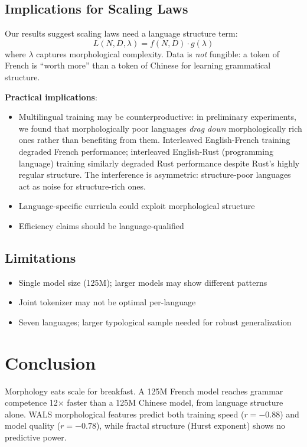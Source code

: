 \documentclass[11pt]{article}
\begin{document}
\subsection{Implications for Scaling Laws}

Our results suggest scaling laws need a language structure term:
\[
L(N, D, \lambda) = f(N, D) \cdot g(\lambda)
\]
where $\lambda$ captures morphological complexity. Data is \textit{not} fungible: a token of French is ``worth more'' than a token of Chinese for learning grammatical structure.

\textbf{Practical implications}:
\begin{itemize}
    \item Multilingual training may be counterproductive: in preliminary experiments, we found that morphologically poor languages \textit{drag down} morphologically rich ones rather than benefiting from them. Interleaved English-French training degraded French performance; interleaved English-Rust (programming language) training similarly degraded Rust performance despite Rust's highly regular structure. The interference is asymmetric: structure-poor languages act as noise for structure-rich ones.
    \item Language-specific curricula could exploit morphological structure
    \item Efficiency claims should be language-qualified
\end{itemize}

\subsection{Limitations}

\begin{itemize}
    \item Single model size (125M); larger models may show different patterns
    \item Joint tokenizer may not be optimal per-language
    \item Seven languages; larger typological sample needed for robust generalization
\end{itemize}

\section{Conclusion}

Morphology eats scale for breakfast. A 125M French model reaches grammar competence 12× faster than a 125M Chinese model, from language structure alone. WALS morphological features predict both training speed ($r=-0.88$) and model quality ($r=-0.78$), while fractal structure (Hurst exponent) shows no predictive power.
\end{document}
